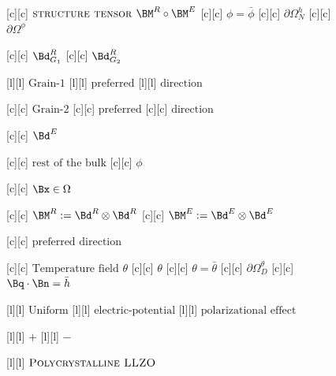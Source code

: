 \begin{figure}[ht]
	[c] {$\textsc{structure tensor } \BM^{R} \circ \BM^{E}$}
	[c] {$\phi=\bar{\phi}$}
	[c] {$\partial\Omega^{h}_{N}$}
	[c] {$\partial\Omega^{\phi}$}

	[c] {$\Bd^{R}_{G_1}$}
	[c] {$\Bd^{R}_{G_2}$}

	[l] {$\text{Grain-1}$}
	[l] {$\text{preferred}$}
	[l] {$\text{direction}$}

	[c] {$\text{Grain-2}$}
	[c] {$\text{preferred}$}
	[c] {$\text{direction}$}

	[c] {$\Bd^{E}$}

	[c] {$\text{rest of the bulk}$}
	[c] {$\phi$}

	[c] {$\Bx \in \Omega$}

	[c] {$\BM^{R} := \Bd^{R} \otimes \Bd^{R}$}
	[c] {$\BM^{E} := \Bd^{E} \otimes \Bd^{E}$}

	[c] {$\text{preferred direction}$}

	[c] {$\text{Temperature field }  \theta$}
	[c] {$\theta$}
	[c] {$\theta = \bar{\theta}$}
	[c] {$\partial\Omega^{\theta}_{D}$}
	[c] {$\Bq\cdot\Bn = \bar{h}$}

	[l] {$\text{Uniform}$}
	[l] {$\text{electric-potential}$}
	[l] {$\text{polarizational effect}$}

	[l] {$+$}
	[l] {$-$}

	[l] {$\textsc{Polycrystalline LLZO}$}


\end{figure}
